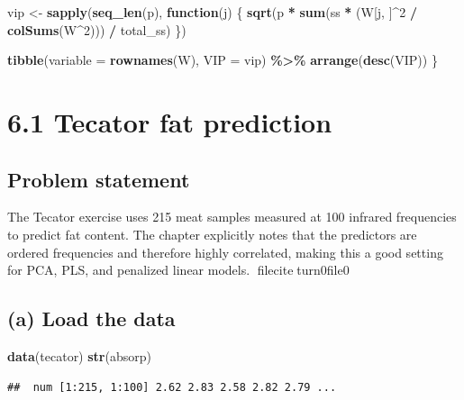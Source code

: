 \documentclass[
  11pt,
]{article}
\newenvironment{Shaded}{\begin{snugshade}}{\end{snugshade}}
\newcommand{\AttributeTok}[1]{\textcolor[rgb]{0.13,0.29,0.53}{#1}}
\newcommand{\ControlFlowTok}[1]{\textcolor[rgb]{0.13,0.29,0.53}{\textbf{#1}}}
\newcommand{\DecValTok}[1]{\textcolor[rgb]{0.00,0.00,0.81}{#1}}
\newcommand{\FunctionTok}[1]{\textcolor[rgb]{0.13,0.29,0.53}{\textbf{#1}}}
\newcommand{\NormalTok}[1]{#1}
\newcommand{\OtherTok}[1]{\textcolor[rgb]{0.56,0.35,0.01}{#1}}
\newcommand{\SpecialCharTok}[1]{\textcolor[rgb]{0.81,0.36,0.00}{\textbf{#1}}}
\begin{document}
\begin{Shaded}
\begin{Highlighting}[]
\NormalTok{  vip }\OtherTok{\textless{}{-}} \FunctionTok{sapply}\NormalTok{(}\FunctionTok{seq\_len}\NormalTok{(p), }\ControlFlowTok{function}\NormalTok{(j) \{}
    \FunctionTok{sqrt}\NormalTok{(p }\SpecialCharTok{*} \FunctionTok{sum}\NormalTok{(ss }\SpecialCharTok{*}\NormalTok{ (W[j, ]}\SpecialCharTok{\^{}}\DecValTok{2} \SpecialCharTok{/} \FunctionTok{colSums}\NormalTok{(W}\SpecialCharTok{\^{}}\DecValTok{2}\NormalTok{))) }\SpecialCharTok{/}\NormalTok{ total\_ss)}
\NormalTok{  \})}

  \FunctionTok{tibble}\NormalTok{(}\AttributeTok{variable =} \FunctionTok{rownames}\NormalTok{(W), }\AttributeTok{VIP =}\NormalTok{ vip) }\SpecialCharTok{\%\textgreater{}\%} \FunctionTok{arrange}\NormalTok{(}\FunctionTok{desc}\NormalTok{(VIP))}
\NormalTok{\}}
\end{Highlighting}
\end{Shaded}

\section{6.1 Tecator fat prediction}\label{tecator-fat-prediction}

\subsection{Problem statement}\label{problem-statement}

The Tecator exercise uses 215 meat samples measured at 100 infrared
frequencies to predict fat content. The chapter explicitly notes that
the predictors are ordered frequencies and therefore highly correlated,
making this a good setting for PCA, PLS, and penalized linear models.
fileciteturn0file0

\subsection{(a) Load the data}\label{a-load-the-data}

\begin{Shaded}
\begin{Highlighting}[]
\FunctionTok{data}\NormalTok{(tecator)}
\FunctionTok{str}\NormalTok{(absorp)}
\end{Highlighting}
\end{Shaded}

\begin{verbatim}
##  num [1:215, 1:100] 2.62 2.83 2.58 2.82 2.79 ...
\end{verbatim}
\end{document}
